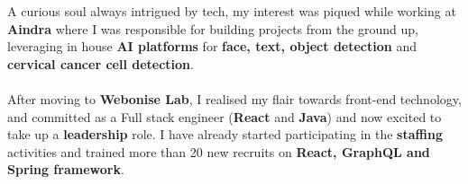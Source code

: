 \documentclass[10pt,a4paper,ragged2e,withhyper]{altacv}
\begin{document}
\begin{paracol}{2}


A curious soul always intrigued by tech, my interest was piqued while working at \textbf{Aindra} where I was responsible for building projects from the ground up, leveraging in house \textbf{AI platforms} for \textbf{face, text, object detection} and \textbf{cervical cancer cell detection}.\\~\\

After moving to \textbf{Webonise Lab}, I realised my flair towards front-end technology, and committed as a Full stack engineer (\textbf{React} and \textbf{Java}) and now excited to take up a \textbf{leadership} role. I have already started participating in the \textbf{staffing} activities and trained more than 20 new recruits on \textbf{React, GraphQL and Spring framework}.












\end{paracol}
\end{document}

